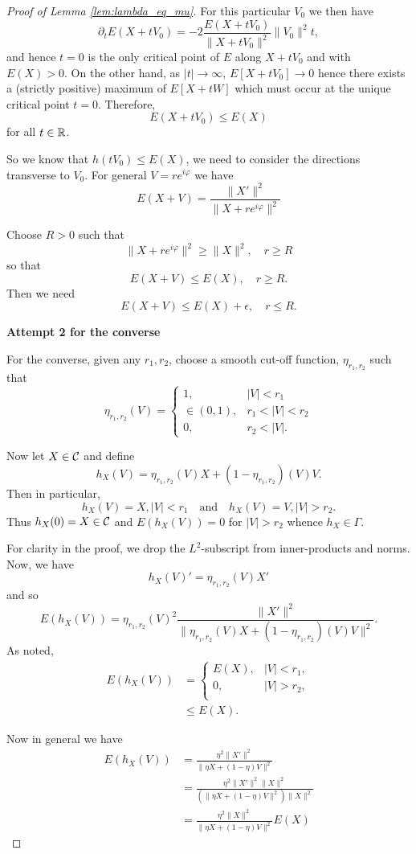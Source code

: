 \documentclass[12pt]{article}
\begin{document}
\begin{proof}[Proof of Lemma \ref{lem:lambda_eq_mu}]
For this particular \(V_0\) we then have
\[
\partial_t E(X + tV_0) = -2 \frac{E(X+tV_0)}{\|X+tV_0\|^2} \|V_0\|^2 t,
\]
and hence \(t = 0\) is the only critical point of \(E\) along \(X + tV_0\) and with \(E(X) > 0\). On the other hand, as \(|t| \to \infty\), \(E[X+tV_0] \to 0 \) hence there exists a (strictly positive) maximum of \(E[X+tW]\) which must occur at the unique critical point \(t = 0\). Therefore,
\[
E(X + t V_0) \leq E(X)
\]
for all \(t \in \operatorname{\mathbb{R}}\).

So we know that \(h(tV_0) \leq E(X)\), we need to consider the directions transverse to \(V_0\). For general \(V = r e^{i\varphi}\) we have
\[
E(X + V) = \frac{\|X'\|^2}{\|X + r e^{i\varphi}\|^2}
\]

Choose \(R > 0\) such that
\[
\|X + r e^{i\varphi}\|^2 \geq \|X\|^2, \quad r \geq R
\]
so that
\[
E(X + V) \leq E(X), \quad r \geq R.
\]
Then we need
\[
E(X + V) \leq E(X) + \epsilon, \quad r \leq R.
\]

\textbf{Attempt 2 for the converse}

For the converse, given any \(r_1, r_2\), choose a smooth cut-off function, \(\eta_{r_1, r_2}\) such that
\[
\eta_{r_1, r_2} (V) = \begin{cases}
1, & |V| < r_1 \\
\in (0, 1), & r_1 < |V| < r_2 \\
0, & r_2 < |V|.
\end{cases}
\]

Now let \(X \in \operatorname{\mathcal{C}}\) and define
\[
h_X(V) = \eta_{r_1,r_2}(V) X + (1 - \eta_{r_1,r_2}) (V) V.
\]
Then in particular, 
\[
h_X(V) = X, |V| < r_1 \quad \text{and} \quad h_X(V) = V, |V| > r_2.
\]
Thus \(h_X(0) = X \in \operatorname{\mathcal{C}}\) and \(E(h_X(V)) = 0\) for \(|V| > r_2\) whence \(h_X \in \Gamma\).

For clarity in the proof, we drop the \(L^2\)-subscript from inner-products and norms. Now, we have
\[
h_X(V)' = \eta_{r_1,r_2}(V) X'
\]
and so
\[
E(h_X(V)) = \eta_{r_1,r_2}(V)^2 \frac{\|X'\|^2}{\|\eta_{r_1,r_2}(V) X + (1 - \eta_{r_1,r_2}) (V) V\|^2}.
\]
As noted,
\[
\begin{split}
E(h_X(V)) & = \begin{cases}
E(X), &|V| < r_1, \\
0, &|V| > r_2, \\
\end{cases} \\
& \leq E(X).
\end{split}
\]

Now in general we have
\[
\begin{split}
E(h_X(V)) &= \frac{\eta^2 \|X'\|^2}{\|\eta X + (1 - \eta) V\|^2} \\
&= \frac{\eta^2 \|X'\|^2\|X\|^2 }{(\|\eta X + (1 - \eta) V\|^2)\|X\|^2}\\
&= \frac{\eta^2 \|X\|^2}{\|\eta X + (1 - \eta) V\|^2} E(X)
\end{split}
\]

\end{proof}
\end{document}
